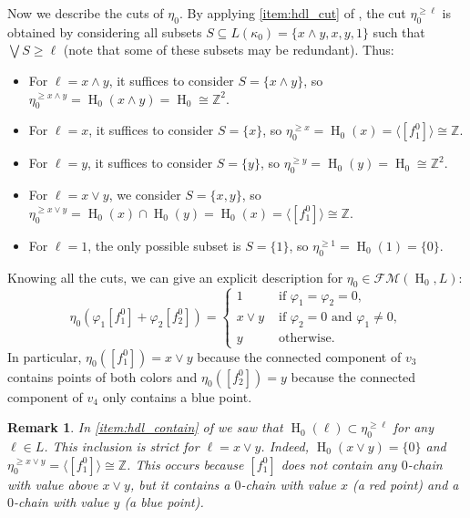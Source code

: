 \documentclass[a4paper,10pt]{article}
\newtheorem{remark}[theorem]{Remark}
\newcommand{\bbz}{\mathbb{Z}}
\newcommand{\calfm}{\mathcal{F\!M}}
\DeclareMathOperator{\Ho}{H}
\begin{document}
Now we describe the cuts of \(\eta_0\). By applying \cref{item:hdl_cut} of , the cut \(\eta_0^{\geq \ell}\) is obtained by considering all subsets \(S \subseteq L(\kappa_0) = \{x \wedge y, x, y, 1\}\) such that \(\bigvee S \geq \ell\) (note that some of these subsets may be redundant). Thus:
\begin{itemize}
\item[--] For \(\ell=x \wedge y\), it suffices to consider \(S=\{x \wedge y\}\), so \(\eta_0^{\geq x \wedge y}=\Ho_0(x \wedge y)=\Ho_0 \cong \bbz^2\).
\item[--] For \(\ell=x\), it suffices to consider \(S=\{x\}\), so \(\eta_0^{\geq x}=\Ho_0(x)=\langle [f^0_1]\rangle \cong \bbz\).
\item[--] For \(\ell=y\), it suffices to consider \(S=\{y\}\), so \(\eta_0^{\geq y}=\Ho_0(y)=\Ho_0 \cong \bbz^2\).
\item[--] For \(\ell=x \vee y\), we consider \(S=\{x,y\}\), so \(\eta_0^{\geq x \vee y} = \Ho_0(x) \cap \Ho_0(y) = \Ho_0(x) = \langle [f^0_1]\rangle \cong \bbz\).
\item[--] For \(\ell=1\), the only possible subset is \(S=\{1\}\), so \(\eta_0^{\geq 1} = \Ho_0(1)=\{0\}\).
\end{itemize}
Knowing all the cuts, we can give an explicit description for \(\eta_0 \in \calfm(\Ho_0,L)\):
\[
\eta_0(\varphi_1[f^0_1]+\varphi_2[f^0_2])=
\begin{cases}
1 & \text{ if } \varphi_1=\varphi_2 = 0, \\
x \vee y & \text{ if } \varphi_2 = 0 \text{ and } \varphi_1 \neq 0, \\
y & \text{ otherwise.}
\end{cases}
\]
In particular, \(\eta_0([f^0_1])=x \vee y\) because the connected component of \(v_3\) contains points of both colors and \(\eta_0([f^0_2])=y\) because the connected component of \(v_4\) only contains a blue point.

\begin{remark}
\label{rem:counterexample1}
In \cref{item:hdl_contain} of  we saw that \(\Ho_0(\ell) \subset \eta_0^{\geq \ell}\) for any \(\ell \in L\). This inclusion is strict for \(\ell = x \vee y\). Indeed, \(\Ho_0(x \vee y) = \{0\}\) and \(\eta_0^{\geq x\vee y}=\langle [f^0_1]\rangle \cong \bbz\). This occurs because \([f^0_1]\) does not contain any \(0\)-chain with value above \(x \vee y\), but it contains a \(0\)-chain with value \(x\) (a red point) and a \(0\)-chain with value \(y\) (a blue point).
\end{remark}
\end{document}
